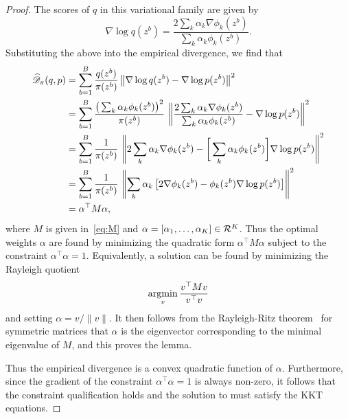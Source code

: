 \begin{proof}
    The scores of $q$ in this variational family are given by
\[\nabla\log q(z^b) = \frac{2\sum_k \alpha_k \nabla \phi_k(z^b)}{\sum_k \alpha_k \phi_k(z^b)}. \]
Substituting the above into the empirical divergence, we find that
\begin{align*}
    \widehat{\mathscr{D}}_{\pi}(q, p) &=   \sum_{b=1}^B \frac{q(z^b)}{\pi(z^b)} \, \big\|\nabla \log q(z^b) - \nabla\log p(z^b)\big\|^2\\
    &=  \sum_{b=1}^B \frac{\big(\sum_{k} \alpha_k \phi_k(z^b)\big)^2}{\pi(z^b)} \, \left\|\frac{2\sum_k \alpha_k \nabla \phi_k(z^b)}{\sum_k \alpha_k \phi_k(z^b)} - \nabla\log p(z^b)\right\|^2 \\
    &=  \sum_{b=1}^B \frac{1}{\pi(z^b)} \, \left\|2\sum_k \alpha_k \nabla \phi_k(z^b) - \bigg[\sum_{k}
    \alpha_k \phi_k(z^b)\bigg]\nabla\log p(z^b)\right\|^2\\
    &= \sum_{b=1}^B \frac{1}{\pi(z^b)} \, \left\|\sum_k \alpha_k \left[ 2\nabla \phi_k(z^b) -
\phi_k(z^b)\nabla\log p(z^b)\right]\right\|^2 \\
    &= \alpha^\top M \alpha,
\end{align*}
where $M$ is given in~\eqref{eq:M} and  $\alpha =[\alpha_1, \ldots, \alpha_K]\in \mathcal{R}^K$. Thus the optimal weights $\alpha$ are found by minimizing the quadratic form $\alpha^\top M\alpha$ subject to the constraint $\alpha^\top\alpha=1$. Equivalently, a solution can be found by minimizing the Rayleigh quotient
\begin{equation}
\operatorname*{argmin}_v \frac{v^\top M v}{v^\top v}
\end{equation}
and setting $\alpha=v/\|v\|$. It then follows from the Rayleigh-Ritz theorem~\citep{courant1924methoden} for symmetric matrices that $\alpha$ is the eigenvector corresponding to the minimal eigenvalue of $M$, and this proves the lemma.

\iffalse
Thus the empirical divergence is a convex quadratic function of $\alpha$. Furthermore, since the gradient of the constraint $\alpha^\top\alpha=1$ is always non-zero, it follows that the constraint qualification holds and the solution to
     must satisfy the KKT equations.


\end{proof}
